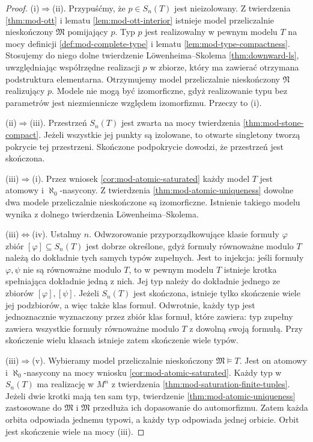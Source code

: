 \begin{proof}
(i)$\Rightarrow$(ii).
Przypuśćmy, że $p\in S_n(T)$ jest nieizolowany.
Z twierdzenia \ref{thm:mod-ott} i lematu
\ref{lem:mod-ott-interior} istnieje model
przeliczalnie nieskończony $\mathfrak M$
pomijający $p$. Typ $p$ jest realizowalny w pewnym modelu $T$
na mocy definicji \ref{def:mod-complete-type}
i lematu \ref{lem:mod-type-compactness}.
Stosujemy do niego dolne twierdzenie
Löwenheima--Skolema \ref{thm:downward-ls},
uwzględniając współrzędne realizacji $p$
w zbiorze, który ma zawierać otrzymana
podstruktura elementarna. Otrzymujemy model
przeliczalnie nieskończony $\mathfrak N$
realizujący $p$. Modele nie mogą być izomorficzne,
gdyż realizowanie typu bez parametrów jest
niezmiennicze względem izomorfizmu.
Przeczy to (i).

(ii)$\Rightarrow$(iii).
Przestrzeń $S_n(T)$ jest zwarta na mocy
twierdzenia \ref{thm:mod-stone-compact}.
Jeżeli wszystkie jej punkty są izolowane,
to otwarte singletony tworzą pokrycie
tej przestrzeni. Skończone podpokrycie
dowodzi, że przestrzeń jest skończona.

(iii)$\Rightarrow$(i).
Przez wniosek \ref{cor:mod-atomic-saturated}
każdy model $T$ jest atomowy i $\aleph_0$-nasycony.
Z twierdzenia \ref{thm:mod-atomic-uniqueness}
dowolne dwa modele przeliczalnie nieskończone
są izomorficzne. Istnienie takiego modelu
wynika z dolnego twierdzenia Löwenheima--Skolema.

(iii)$\Leftrightarrow$(iv).
Ustalmy $n$. Odwzorowanie przyporządkowujące
klasie formuły $\varphi$ zbiór
$[\varphi]\subseteq S_n(T)$ jest dobrze określone,
gdyż formuły równoważne modulo $T$ należą
do dokładnie tych samych typów zupełnych.
Jest to injekcja:
jeśli formuły $\varphi,\psi$ nie są równoważne
modulo $T$, to w pewnym modelu $T$
istnieje krotka spełniająca dokładnie jedną
z nich. Jej typ należy do dokładnie jednego
ze zbiorów $[\varphi],[\psi]$.
Jeżeli $S_n(T)$ jest skończona, istnieje
tylko skończenie wiele jej podzbiorów,
a więc także klas formuł.
Odwrotnie, każdy typ jest jednoznacznie
wyznaczony przez zbiór klas formuł, które
zawiera: typ zupełny zawiera wszystkie
formuły równoważne modulo $T$ z dowolną
swoją formułą. Przy skończenie wielu klasach
istnieje zatem skończenie wiele typów.

(iii)$\Rightarrow$(v).
Wybieramy model przeliczalnie nieskończony
$\mathfrak M\models T$. Jest on atomowy
i $\aleph_0$-nasycony na mocy wniosku
\ref{cor:mod-atomic-saturated}.
Każdy typ w $S_n(T)$ ma realizację w $M^n$
z twierdzenia \ref{thm:mod-saturation-finite-tuples}.
Jeżeli dwie krotki mają ten sam typ,
twierdzenie \ref{thm:mod-atomic-uniqueness}
zastosowane do $\mathfrak M$ i $\mathfrak M$
przedłuża ich dopasowanie do automorfizmu.
Zatem każda orbita odpowiada jednemu typowi,
a każdy typ odpowiada jednej orbicie.
Orbit jest skończenie wiele na mocy (iii).


\end{proof}
